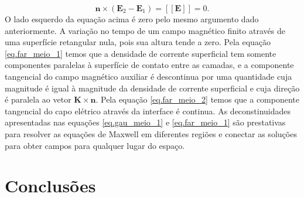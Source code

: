 \begin{equation}\label{eq.far_meio_2}
\mathbf{n}\times(\mathbf{E}_2-\mathbf{E}_1)=\left[\left[\mathbf{E}\right]\right]=0.
\end{equation}
O lado esquerdo da equa\c{c}\~ao acima \'e zero pelo mesmo argumento dado anteriormente. A varia\c{c}\~ao no tempo de um campo magn\'etico finito atrav\'es de uma superf\'icie retangular nula, pois sua altura tende a zero.
Pela equa\c{c}\~ao \ref{eq.far_meio_1} temos que a densidade de corrente superficial tem somente componentes paralelas \`a superf\'icie de contato entre as camadas, e a componente tangencial do campo magn\'etico auxiliar \'e descontinua por uma quantidade cuja magnitude \'e igual \`a magnitude da densidade de corrente superficial e cuja dire\c{c}\~ao \'e paralela ao vetor $\mathbf{K}\times\mathbf{n}$. Pela equa\c{c}\~ao \ref{eq.far_meio_2} temos que a componente tangencial do capo el\'etrico atrav\'es da interface \'e continua. As deconstinuidades apresentadas nas equa\c{c}\~oes \ref{eq.gau_meio_1} e \ref{eq.far_meio_1} s\~ao prestativas para resolver as equa\c{c}\~oes de Maxwell em diferentes regi\~oes e conectar as solu\c{c}\~oes para obter campos para qualquer lugar do espa\c{c}o.  






\section{Conclusões}